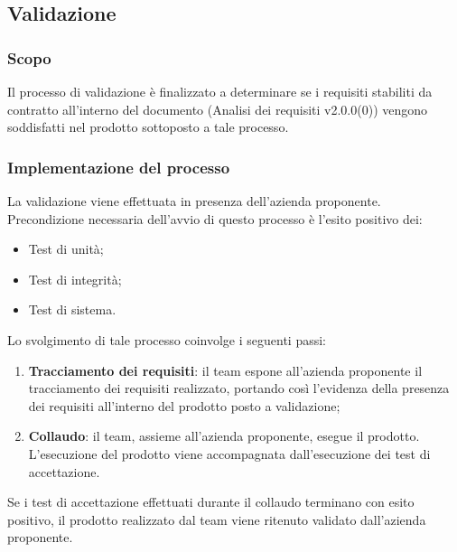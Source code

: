 \documentclass[10pt, a4paper]{article}
\begin{document}
\subsection{Validazione}
\subsubsection{Scopo}
Il processo di validazione è finalizzato a determinare se i requisiti stabiliti da contratto all'interno del documento (Analisi dei requisiti v2.0.0(0)) vengono soddisfatti nel 
prodotto sottoposto a tale processo.

\subsubsection{Implementazione del processo}
La validazione viene effettuata in presenza dell'azienda proponente.\\
Precondizione necessaria dell'avvio di questo processo è l'esito positivo dei:
\begin{itemize}
    \item Test di unità;
    \item Test di integrità;
    \item Test di sistema.
\end{itemize}
Lo svolgimento di tale processo coinvolge i seguenti passi:
\begin{enumerate}
    \item \textbf{Tracciamento dei requisiti}: il team espone all'azienda proponente il tracciamento dei requisiti realizzato, portando così 
    l'evidenza della presenza dei requisiti all'interno del prodotto posto a validazione;
    \item \textbf{Collaudo}: il team, assieme all'azienda proponente, esegue il prodotto. L'esecuzione del prodotto viene accompagnata 
    dall'esecuzione dei test di accettazione.
\end{enumerate}
Se i test di accettazione effettuati durante il collaudo terminano con esito positivo, il prodotto realizzato dal team viene ritenuto validato dall'azienda proponente.
\end{document}
